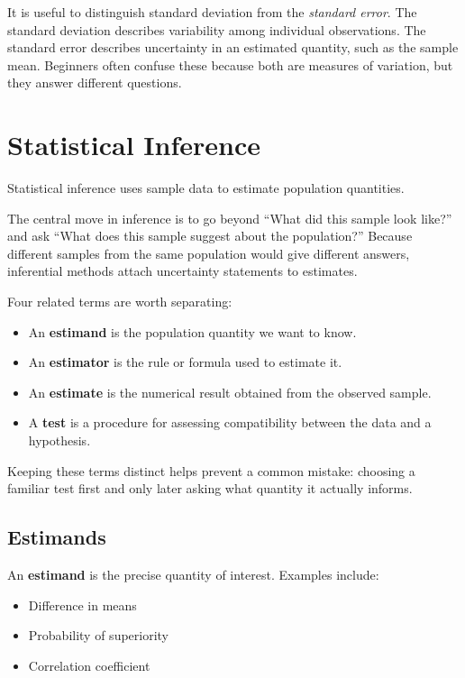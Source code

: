 \documentclass[11pt]{article}
\begin{document}
It is useful to distinguish standard deviation from the \emph{standard error}. The standard deviation describes variability among individual observations. The standard error describes uncertainty in an estimated quantity, such as the sample mean. Beginners often confuse these because both are measures of variation, but they answer different questions.

\section{Statistical Inference}

Statistical inference uses sample data to estimate population quantities.

The central move in inference is to go beyond ``What did this sample look like?'' and ask ``What does this sample suggest about the population?'' Because different samples from the same population would give different answers, inferential methods attach uncertainty statements to estimates.

Four related terms are worth separating:
\begin{itemize}
\item An \textbf{estimand} is the population quantity we want to know.
\item An \textbf{estimator} is the rule or formula used to estimate it.
\item An \textbf{estimate} is the numerical result obtained from the observed sample.
\item A \textbf{test} is a procedure for assessing compatibility between the data and a hypothesis.
\end{itemize}

Keeping these terms distinct helps prevent a common mistake: choosing a familiar test first and only later asking what quantity it actually informs.

\subsection{Estimands}

An \textbf{estimand} is the precise quantity of interest. Examples include:
\begin{itemize}
\item Difference in means
\item Probability of superiority
\item Correlation coefficient
\end{itemize}
\end{document}
